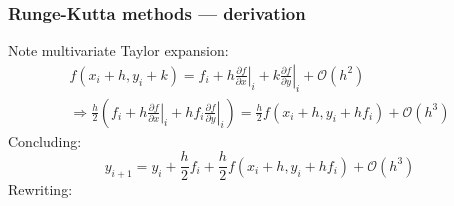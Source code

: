\begin{frame}
  \frametitle{Runge-Kutta methods --- derivation}
  Note multivariate Taylor expansion:
  \begin{multline*}
    f(x_i+h,y_i+k) = f_i + h \left. \frac{\partial f}{\partial x}\right|_i + k\left. \frac{\partial f}{\partial y}\right|_i + \mathcal{O}{(h^2)} \\
    \Rightarrow \frac{h}{2}\left(f_i + h\left.\frac{\partial f}{\partial x}\right|_i + h f_i \left. \frac{\partial f}{\partial y} \right|_i \right) = \frac{h}{2} f\left(x_i+h,y_i+hf_i\right) + \mathcal{O}{(h^3)}
  \end{multline*}
  Concluding:
  \[
    y_{i+1} = y_i + \frac{h}{2} f_i + \frac{h}{2} f\left(x_i+h,y_i+hf_i\right) + \mathcal{O}{(h^3)}
  \]
  Rewriting:\\
\end{frame}

